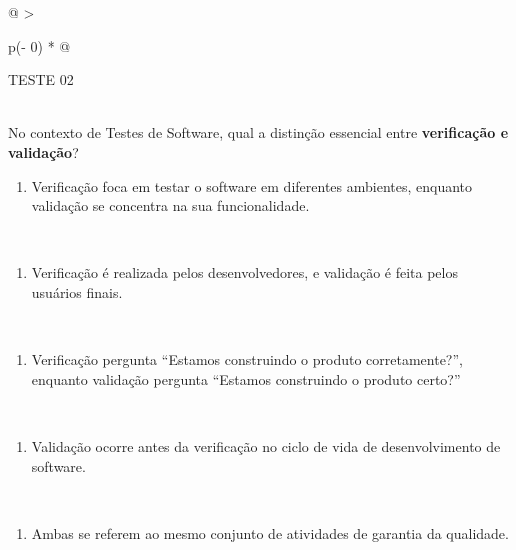 \documentclass[
]{book}
\providecommand{\tightlist}{%
  \setlength{\itemsep}{0pt}\setlength{\parskip}{0pt}}
\begin{document}
\begin{longtable}[]{@{}
  >{\raggedright\arraybackslash}p{(\columnwidth - 0\tabcolsep) * }@{}}
\toprule\noalign{}
\begin{minipage}[b]{\linewidth}\raggedright
TESTE 02
\end{minipage} \\
\midrule\noalign{}
\endhead
\bottomrule\noalign{}
\endlastfoot
No contexto de Testes de Software, qual a distinção essencial entre \textbf{verificação e validação}? \\
\begin{minipage}[t]{\linewidth}\raggedright
\begin{enumerate}
\def\labelenumi{\alph{enumi})}
\tightlist
\item
  Verificação foca em testar o software em diferentes ambientes, enquanto validação se concentra na sua funcionalidade.
\end{enumerate}
\end{minipage} \\
\begin{minipage}[t]{\linewidth}\raggedright
\begin{enumerate}
\def\labelenumi{\alph{enumi})}
\setcounter{enumi}{1}
\tightlist
\item
  Verificação é realizada pelos desenvolvedores, e validação é feita pelos usuários finais.
\end{enumerate}
\end{minipage} \\
\begin{minipage}[t]{\linewidth}\raggedright
\begin{enumerate}
\def\labelenumi{\alph{enumi})}
\setcounter{enumi}{2}
\tightlist
\item
  Verificação pergunta ``Estamos construindo o produto corretamente?'', enquanto validação pergunta ``Estamos construindo o produto certo?''
\end{enumerate}
\end{minipage} \\
\begin{minipage}[t]{\linewidth}\raggedright
\begin{enumerate}
\def\labelenumi{\alph{enumi})}
\setcounter{enumi}{3}
\tightlist
\item
  Validação ocorre antes da verificação no ciclo de vida de desenvolvimento de software.
\end{enumerate}
\end{minipage} \\
\begin{minipage}[t]{\linewidth}\raggedright
\begin{enumerate}
\def\labelenumi{\alph{enumi})}
\setcounter{enumi}{4}
\tightlist
\item
  Ambas se referem ao mesmo conjunto de atividades de garantia da qualidade.
\end{enumerate}
\end{minipage} \\
\end{longtable}
\end{document}
